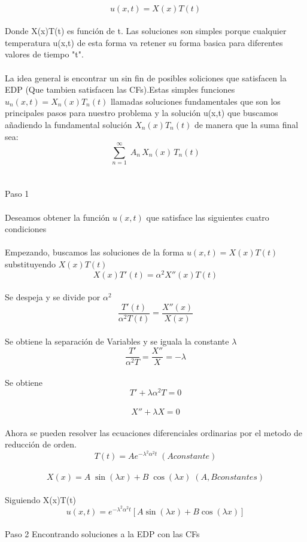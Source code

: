 \documentclass[10pt,a4paper]{report}
\begin{document}
\\ $$u(x,t)=X(x)T(t)$$
\\ Donde X(x)T(t) es función de t. Las soluciones son simples porque cualquier temperatura u(x,t) de esta forma va retener su forma basica para diferentes valores de tiempo "t".
\\\\ La idea general is encontrar un sin fin de posibles soliciones que satisfacen la EDP (Que tambien satisfacen las CFs).Estas simples funciones $u_{n}(x,t)= X_n (x) T_n (t)$ llamadas soluciones fundamentales que son los principales pasos para nuestro problema y la solución u(x,t) que buscamos añadiendo la fundamental solución $X_n (x) T_n (t)$ de manera que la suma final sea:
\\ $$\displaystyle \sum_{n=1}^\infty \; A_n \, X_n (x) \, T_n(t)$$
\\\\ Paso 1
\\\\ Deseamos obtener la función $u(x,t)$ que satisface las siguientes cuatro condiciones
\\\\ Empezando, buscamos las soluciones de la forma $u(x,t) = X(x)T(t) \; \; $substituyendo $X(x)T(t)$
\\ $$X(x)T'(t)=\alpha^2 X''(x)T(t) $$
\\Se despeja y se divide por $\alpha^2$
\\ $$\displaystyle\frac{T'(t)}{\alpha^2 T(t)} = \frac{X''(x)}{X(x)}$$
\\ Se obtiene la separación de Variables y se iguala la constante $\lambda$
\\  $$\displaystyle \dfrac{T'}{\alpha^2 T} = \frac{X''}{X} = -\lambda$$
\\Se obtiene
\\ $$\displaystyle T' + \lambda \alpha^2 T = 0 $$
\\ $$\displaystyle X'' + \lambda X = 0 $$
\\ Ahora se pueden resolver las ecuaciones diferenciales ordinarias por el metodo de reducción de orden.
\\ $$\displaystyle T(t)= Ae^{-\lambda^2 \alpha^2 t}\; (A constante)$$
\\ $$X(x)=A\; \sin(\lambda x) + B\; \cos(\lambda x)\; (A,B constantes)$$
\\ Siguiendo X(x)T(t)
\\ $$\displaystyle u(x,t)=e^{-\lambda^2 \alpha^2 t} [A \sin(\lambda x)+ B \cos(\lambda x)]$$
\\ Paso 2 Encontrando soluciones a la EDP con las CFs
\end{document}
